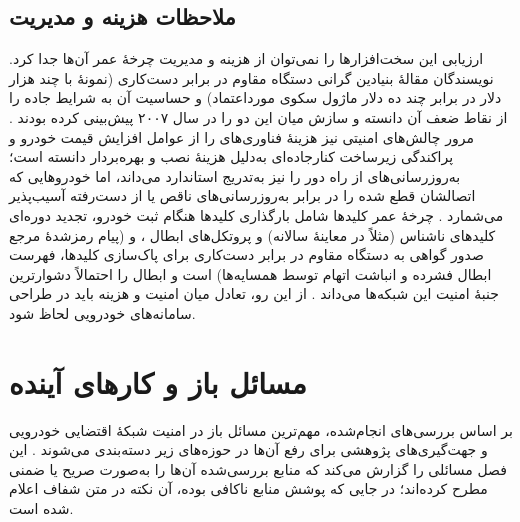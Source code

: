 \documentclass[12pt,a4paper]{article}
\begin{document}
\subsection{ملاحظات هزینه و مدیریت}
ارزیابی این سخت‌افزارها را نمی‌توان از هزینه و مدیریت چرخهٔ عمر آن‌ها جدا کرد. نویسندگان مقالهٔ بنیادین گرانی دستگاه مقاوم در برابر دست‌کاری (نمونهٔ  با چند هزار دلار در برابر چند ده دلار ماژول سکوی مورداعتماد) و حساسیت آن به شرایط جاده را از نقاط ضعف آن دانسته و سازش میان این دو را در سال ۲۰۰۷ پیش‌بینی کرده بودند \cite{SecuringVehicularAd}. مرور چالش‌های امنیتی نیز هزینهٔ فناوری‌های  را از عوامل افزایش قیمت خودرو و پراکندگی زیرساخت کنارجاده‌ای به‌دلیل هزینهٔ نصب و بهره‌بردار دانسته است؛ به‌روزرسانی‌های از راه دور را نیز به‌تدریج استاندارد می‌داند، اما خودرو‌هایی که اتصالشان قطع شده را در برابر به‌روزرسانی‌های ناقص یا از دست‌رفته آسیب‌پذیر می‌شمارد \cite{farsimadanReviewSecurityChallenges2025}. چرخهٔ عمر کلید‌ها شامل بارگذاری کلید‌ها هنگام ثبت خودرو، تجدید دوره‌ای کلید‌های ناشناس (مثلاً در معاینهٔ سالانه) و پروتکل‌های ابطال ،  و  (پیام رمزشدهٔ مرجع صدور گواهی به دستگاه مقاوم در برابر دست‌کاری برای پاک‌سازی کلیدها، فهرست ابطال فشرده و انباشت اتهام توسط همسایه‌ها) است و ابطال را احتمالاً دشوارترین جنبهٔ امنیت این شبکه‌ها می‌داند \cite{SecuringVehicularAd}. از این رو، تعادل میان امنیت و هزینه باید در طراحی سامانه‌های خودرویی لحاظ شود.

\section{مسائل باز و کار‌های آینده}

بر اساس بررسی‌های انجام‌شده، مهم‌ترین مسائل باز در امنیت شبکهٔ اقتضایی خودرویی و جهت‌گیری‌های پژوهشی برای رفع آن‌ها در حوزه‌های زیر دسته‌بندی می‌شوند \cite{farsimadanReviewSecurityChallenges2025, rahmawatiagustinaSystematicLiteratureReview2025}. این فصل مسائلی را گزارش می‌کند که منابع بررسی‌شده آن‌ها را به‌صورت صریح یا ضمنی مطرح کرده‌اند؛ در جایی که پوشش منابع ناکافی بوده، آن نکته در متن شفاف اعلام شده است.
\end{document}

